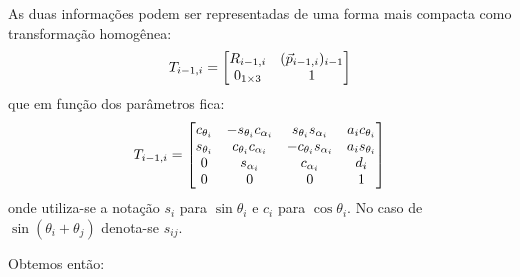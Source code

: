 As duas informações podem ser representadas de uma forma mais compacta como transformação homogênea:
\begin{equation}
T_{i-1,i} = \begin{bmatrix}
	R_{i-1,i} 		&  ({\vec{p}}_{i-1,i})_{i-1} \\
	0_{1 \times 3}	&  							  1
\end{bmatrix}
\end{equation}
que em função dos parâmetros fica:
\begin{equation}
T_{i-1,i} = \begin{bmatrix}
	c_{\theta_i}  & -s_{\theta_i}c_{\alpha_i}	&	s_{\theta_i}s_{\alpha_i}  &	a_i c_{\theta_i} \\ 
	s_{\theta_i}  &	c_{\theta_i}c_{\alpha_i}	&  -c_{\theta_i}s_{\alpha_i}  & a_i s_{\theta_i} \\
	0			  & s_{\alpha_i}				&   c_{\alpha_i}			  &	d_i				 \\
	0			  & 0							&   0						  & 1
\end{bmatrix}
\end{equation}
onde utiliza-se a notação $s_i$ para $\sin \theta_i$ e $c_i$ para $\cos \theta_i$. No caso de  $\sin (\theta_i + \theta_j)$ denota-se $s_{ij}$.

Obtemos então:



